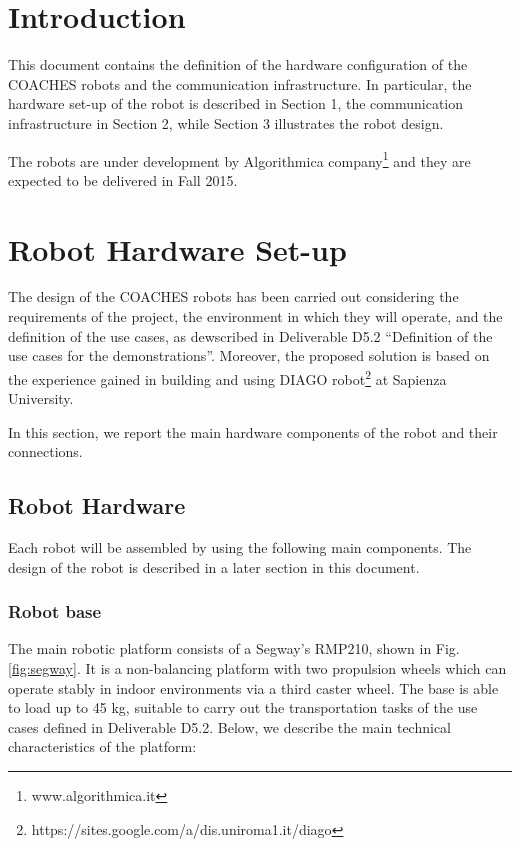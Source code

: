 \section*{Introduction}

This document contains the definition of the hardware configuration of the COACHES robots and the communication infrastructure. In particular, the hardware set-up of the robot is described in Section 1, the communication infrastructure in Section 2, while Section 3 illustrates the robot design.

The robots are under development by Algorithmica company\footnote{www.algorithmica.it} and they are expected to be delivered in Fall 2015.


\section{Robot Hardware Set-up}

The design of the COACHES robots has been carried out considering the requirements of the project, the environment in which they will operate, and the definition of the use cases, as dewscribed in Deliverable D5.2 ``Definition of the use cases for the demonstrations''.
Moreover, the proposed solution is based on the experience gained in building and using DIAGO robot\footnote{https://sites.google.com/a/dis.uniroma1.it/diago} at Sapienza University.

In this section, we report the main hardware components of the robot and their connections.


\subsection{Robot Hardware}

Each robot will be assembled by using the following main components.
The design of the robot is described in a later section in this document.


\subsubsection{Robot base}
The main robotic platform consists of a Segway's RMP210, shown in Fig. \ref{fig:segway}.
It is a non-balancing platform with two propulsion wheels which can operate stably in indoor environments via a third caster wheel. The base is able to load up to 45 kg, suitable to carry out the transportation tasks of the use cases defined in Deliverable D5.2. Below, we describe the main technical characteristics of the platform:

